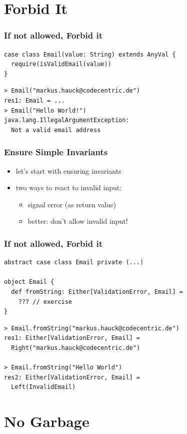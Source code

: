 \documentclass{beamer}
\begin{document}
\section{Forbid It}

\begin{frame}[fragile]
  \frametitle{If not allowed, Forbid it}
\begin{verbatim}
case class Email(value: String) extends AnyVal {
  require(isValidEmail(value))
}
\end{verbatim}
\begin{verbatim}
> Email("markus.hauck@codecentric.de")
res1: Email = ...
> Email("Hello World!")
java.lang.IllegalArgumentException: 
  Not a valid email address                      
\end{verbatim}
\end{frame}

\begin{frame}
  \frametitle{Ensure Simple Invariants}
  \begin{itemize}
  \item let's start with ensuring invariants
  \item two ways to react to invalid input:
    \begin{itemize}
    \item signal error (as return value)
    \item better: don't allow invalid input!
    \end{itemize}
  \end{itemize}
\end{frame}

\begin{frame}
  \frametitle{If not allowed, Forbid it}
\begin{verbatim}
abstract case class Email private (...)

object Email {
  def fromString: Either[ValidationError, Email] = 
    ??? // exercise
}
\end{verbatim}

\begin{verbatim}
> Email.fromString("markus.hauck@codecentric.de")
res1: Either[ValidationError, Email] = 
  Right("markus.hauck@codecentric.de")

> Email.fromString("Hello World")
res2: Either[ValidationError, Email] = 
  Left(InvalidEmail)
\end{verbatim}
\end{frame}

\section{No Garbage}
\end{document}
